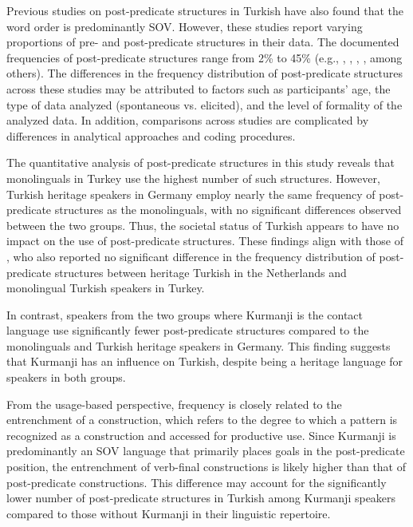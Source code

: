 Previous studies on post-predicate structures in Turkish have also found that the word order is predominantly SOV. However, these studies report varying proportions of pre- and post-predicate structures in their data. The documented frequencies of post-predicate structures range from 2\% to 45\% (e.g., \citealt{Antonova-unlu2015, Antonova-unlu2019}, \citealt{DogruozBackus2007}, \citealt{Saginsimsek2016}, \citealt{SchroederEtAl2024}, among others). The differences in the frequency distribution of post-predicate structures across these studies may be attributed to factors such as participants' age, the type of data analyzed (spontaneous vs. elicited), and the level of formality of the analyzed data. In addition, comparisons across studies are complicated by differences in analytical approaches and coding procedures.

The quantitative analysis of post-predicate structures in this study reveals that monolinguals in Turkey use the highest number of such structures. However, Turkish heritage speakers in Germany employ nearly the same frequency of post-predicate structures as the monolinguals, with no significant differences observed between the two groups. Thus, the societal status of Turkish appears to have no impact on the use of post-predicate structures. These findings align with those of \citet{DogruozBackus2007}, who also reported no significant difference in the frequency distribution of post-predicate structures between heritage Turkish in the Netherlands and monolingual Turkish speakers in Turkey.

In contrast, speakers from the two groups where Kurmanji is the contact language use significantly fewer post-predicate structures compared to the monolinguals and Turkish heritage speakers in Germany. This finding suggests that Kurmanji has an influence on Turkish, despite being a heritage language for speakers in both groups.

From the usage-based perspective, frequency is closely related to the entrenchment of a construction, which refers to the degree to which a pattern is recognized as a construction and accessed for productive use. Since Kurmanji is predominantly an SOV language that primarily places goals in the post-predicate position, the entrenchment of verb-final constructions is likely higher than that of post-predicate constructions. This difference may account for the significantly lower number of post-predicate structures in Turkish among Kurmanji speakers compared to those without Kurmanji in their linguistic repertoire.

